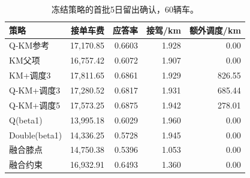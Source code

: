 \begin{table}[htbp]\centering\small
\caption{冻结策略的首批5日留出确认，60辆车。}\label{tab:rlenhance}
\begin{tabularx}{\linewidth}{Yrrrr}\toprule
策略 & 接单车费 & 应答率 & 接驾/km & 额外调度/km\\\midrule
Q-KM参考 & 17,170.85 & 0.6603 & 1.928 & 0.00\\
KM父项 & 16,757.42 & 0.6072 & 1.907 & 0.00\\
KM+调度3 & 17,811.65 & 0.6861 & 1.929 & 826.55\\
Q-KM+调度3 & 17,280.52 & 0.6817 & 1.931 & 685.44\\
Q-KM+调度5 & 17,573.25 & 0.6875 & 1.942 & 278.01\\
Q(beta1) & 13,995.18 & 0.6029 & 1.960 & 0.00\\
Double(beta1) & 14,336.25 & 0.5728 & 1.945 & 0.00\\
融合膝点 & 14,750.38 & 0.5396 & 1.053 & 0.00\\
融合约束 & 16,932.91 & 0.6493 & 1.360 & 0.00\\
\bottomrule\end{tabularx}
\end{table}
